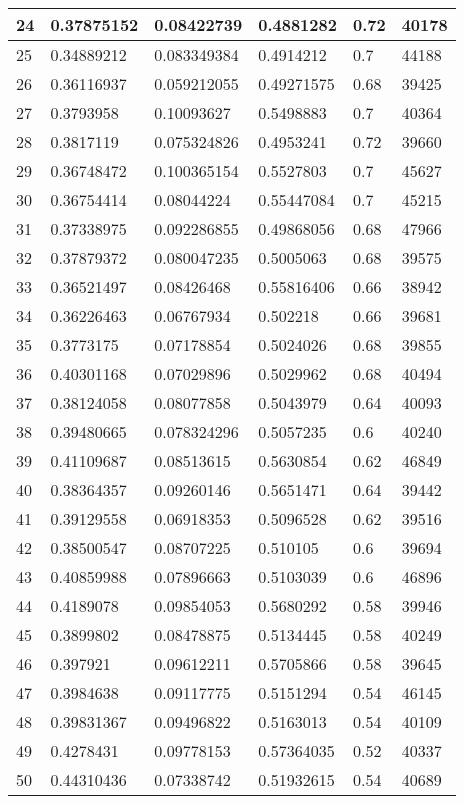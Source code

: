 \begin{longtable}{|l|l|l|l|l|l|}
24 & 0.37875152 & 0.08422739 & 0.4881282 & 0.72 & 40178 \\ \hline 
25 & 0.34889212 & 0.083349384 & 0.4914212 & 0.7 & 44188 \\ \hline 
26 & 0.36116937 & 0.059212055 & 0.49271575 & 0.68 & 39425 \\ \hline 
27 & 0.3793958 & 0.10093627 & 0.5498883 & 0.7 & 40364 \\ \hline 
28 & 0.3817119 & 0.075324826 & 0.4953241 & 0.72 & 39660 \\ \hline 
29 & 0.36748472 & 0.100365154 & 0.5527803 & 0.7 & 45627 \\ \hline 
30 & 0.36754414 & 0.08044224 & 0.55447084 & 0.7 & 45215 \\ \hline 
31 & 0.37338975 & 0.092286855 & 0.49868056 & 0.68 & 47966 \\ \hline 
32 & 0.37879372 & 0.080047235 & 0.5005063 & 0.68 & 39575 \\ \hline 
33 & 0.36521497 & 0.08426468 & 0.55816406 & 0.66 & 38942 \\ \hline 
34 & 0.36226463 & 0.06767934 & 0.502218 & 0.66 & 39681 \\ \hline 
35 & 0.3773175 & 0.07178854 & 0.5024026 & 0.68 & 39855 \\ \hline 
36 & 0.40301168 & 0.07029896 & 0.5029962 & 0.68 & 40494 \\ \hline 
37 & 0.38124058 & 0.08077858 & 0.5043979 & 0.64 & 40093 \\ \hline 
38 & 0.39480665 & 0.078324296 & 0.5057235 & 0.6 & 40240 \\ \hline 
39 & 0.41109687 & 0.08513615 & 0.5630854 & 0.62 & 46849 \\ \hline 
40 & 0.38364357 & 0.09260146 & 0.5651471 & 0.64 & 39442 \\ \hline 
41 & 0.39129558 & 0.06918353 & 0.5096528 & 0.62 & 39516 \\ \hline 
42 & 0.38500547 & 0.08707225 & 0.510105 & 0.6 & 39694 \\ \hline 
43 & 0.40859988 & 0.07896663 & 0.5103039 & 0.6 & 46896 \\ \hline 
44 & 0.4189078 & 0.09854053 & 0.5680292 & 0.58 & 39946 \\ \hline 
45 & 0.3899802 & 0.08478875 & 0.5134445 & 0.58 & 40249 \\ \hline 
46 & 0.397921 & 0.09612211 & 0.5705866 & 0.58 & 39645 \\ \hline 
47 & 0.3984638 & 0.09117775 & 0.5151294 & 0.54 & 46145 \\ \hline 
48 & 0.39831367 & 0.09496822 & 0.5163013 & 0.54 & 40109 \\ \hline 
49 & 0.4278431 & 0.09778153 & 0.57364035 & 0.52 & 40337 \\ \hline 
50 & 0.44310436 & 0.07338742 & 0.51932615 & 0.54 & 40689 \\ \hline 
\end{longtable}